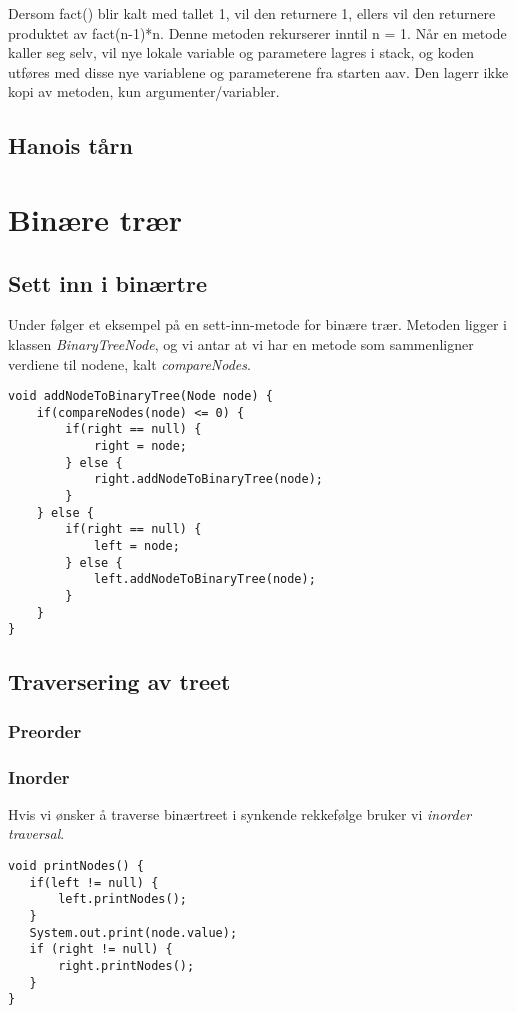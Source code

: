 \documentclass[11pt]{article}
\begin{document}
Dersom fact() blir kalt med tallet 1, vil den returnere 1, ellers vil den returnere produktet av fact(n-1)*n. Denne metoden rekurserer inntil n = 1.
Når en metode kaller seg selv, vil nye lokale variable og parametere lagres i stack, og koden utføres med disse nye variablene og parameterene fra starten aav. Den lagerr ikke kopi av metoden, kun argumenter/variabler.
\subsection{Hanois tårn}
\label{sec-9_1}
\section{Binære trær}
\label{sec-10}
\subsection{Sett inn i binærtre}
\label{sec-10_1}

Under følger et eksempel på en sett-inn-metode for binære
trær. Metoden ligger i klassen \emph{BinaryTreeNode}, og vi antar at vi har
en metode som sammenligner verdiene til nodene, kalt \emph{compareNodes}.

\begin{verbatim}
void addNodeToBinaryTree(Node node) {
    if(compareNodes(node) <= 0) {
        if(right == null) {
            right = node;
        } else {
            right.addNodeToBinaryTree(node);
        }
    } else {
        if(right == null) {
            left = node;
        } else {
            left.addNodeToBinaryTree(node);
        } 
    }
}
\end{verbatim}
\subsection{Traversering av treet}
\label{sec-10_2}
\subsubsection{Preorder}
\label{sec-10_2_1}
\subsubsection{Inorder}
\label{sec-10_2_2}

Hvis vi ønsker å traverse binærtreet i synkende rekkefølge bruker vi
\emph{inorder traversal}.

\begin{verbatim}
void printNodes() {
   if(left != null) {
       left.printNodes();
   }
   System.out.print(node.value);
   if (right != null) {
       right.printNodes();
   }
}
\end{verbatim}
\end{document}
